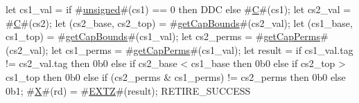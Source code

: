 let cs1_val = if #\hyperref[sailRISCVzunsigned]{unsigned}#(cs1) == 0 then DDC else #\hyperref[sailRISCVzC]{C}#(cs1);
let cs2_val = #\hyperref[sailRISCVzC]{C}#(cs2);
let (cs2_base, cs2_top) = #\hyperref[sailRISCVzgetCapBounds]{getCapBounds}#(cs2_val);
let (cs1_base, cs1_top) = #\hyperref[sailRISCVzgetCapBounds]{getCapBounds}#(cs1_val);
let cs2_perms = #\hyperref[sailRISCVzgetCapPerms]{getCapPerms}#(cs2_val);
let cs1_perms = #\hyperref[sailRISCVzgetCapPerms]{getCapPerms}#(cs1_val);
let result = if cs1_val.tag != cs2_val.tag then
               0b0
             else if cs2_base < cs1_base then
               0b0
             else if cs2_top > cs1_top then
               0b0
             else if (cs2_perms & cs1_perms) != cs2_perms then
               0b0
             else
               0b1;
#\hyperref[sailRISCVzX]{X}#(rd) = #\hyperref[sailRISCVzEXTZ]{EXTZ}#(result);
RETIRE_SUCCESS
